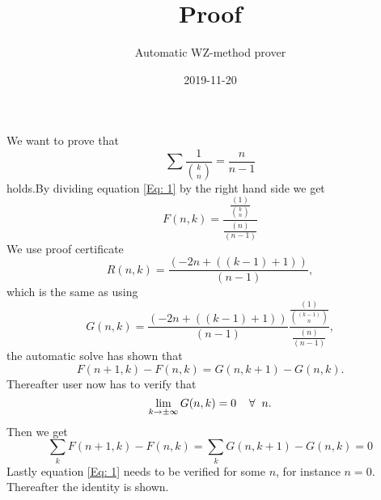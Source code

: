 \documentclass{article}
\title{Proof}
\author{Automatic WZ-method prover}
\date{2019-11-20}
\let\oldforall\forall
\renewcommand{\forall}{\hspace*{2mm}\oldforall\hspace*{1mm}}
\begin{document}
\maketitle
We want to prove that
\begin{equation}\label{Eq: 1}
\sum \frac{1}{\binom{k}{n}}=\frac{n}{n-1}
\end{equation}
holds.By dividing equation \ref{Eq: 1} by the right hand side we get
\begin{equation}
F(n,k)=\frac{\frac{(1)}{\binom{k}{n}}}{\frac{(n)}{(n-1)}}
\end{equation}
We use proof certificate
\begin{equation}
R(n,k)=\frac{(-2n+((k-1)+1))}{(n-1)},
\end{equation}
which is the same as using
\begin{equation}
G(n,k)=\frac{(-2n+((k-1)+1))}{(n-1)}\frac{\frac{(1)}{\binom{(k-1)}{n}}}{\frac{(n)}{(n-1)}},
\end{equation}
the automatic solve has  shown that
\begin{equation}\label{Eq: WZ1}
F(n+1,k)-F(n,k)=G(n,k+1)-G(n,k).
\end{equation}
Thereafter user now has to verify that
\begin{equation}
\lim_{k\to\pm\infty}G(n,k)=0\forall n.
\end{equation}
Then we get
\begin{equation}
\sum_k F(n+1,k)-F(n,k)=\sum_k G(n,k+1)-G(n,k)=0\end{equation}Lastly equation \ref{Eq: 1} needs to be verified for some $n$, for instance $n=0$. Thereafter the identity is shown.
\end{document}
